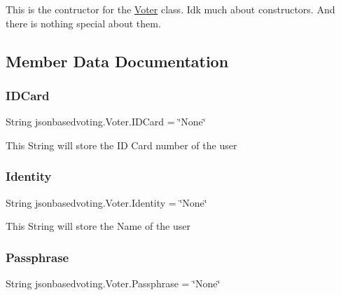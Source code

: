 This is the contructor for the \mbox{\hyperlink{classjsonbasedvoting_1_1_voter}{Voter}} class. Idk much about constructors. And there is nothing special about them. 

\subsection{Member Data Documentation}
\mbox{\label{classjsonbasedvoting_1_1_voter_a3b7931f933d5742d73e2c362937de240}} 
\subsubsection{\texorpdfstring{IDCard}{IDCard}}
{\footnotesize\ttfamily String jsonbasedvoting.\+Voter.\+I\+D\+Card = \char`\"{}None\char`\"{}\hspace{0.3cm}{\ttfamily [package]}}

This String will store the ID Card number of the user \mbox{\label{classjsonbasedvoting_1_1_voter_a52bcd2c36e61a6230e7e37988243214d}} 
\subsubsection{\texorpdfstring{Identity}{Identity}}
{\footnotesize\ttfamily String jsonbasedvoting.\+Voter.\+Identity = \char`\"{}None\char`\"{}\hspace{0.3cm}{\ttfamily [package]}}

This String will store the Name of the user \mbox{\label{classjsonbasedvoting_1_1_voter_a837e40aad8acadfa796c4a6e6916cb27}} 
\subsubsection{\texorpdfstring{Passphrase}{Passphrase}}
{\footnotesize\ttfamily String jsonbasedvoting.\+Voter.\+Passphrase = \char`\"{}None\char`\"{}\hspace{0.3cm}{\ttfamily [package]}}

